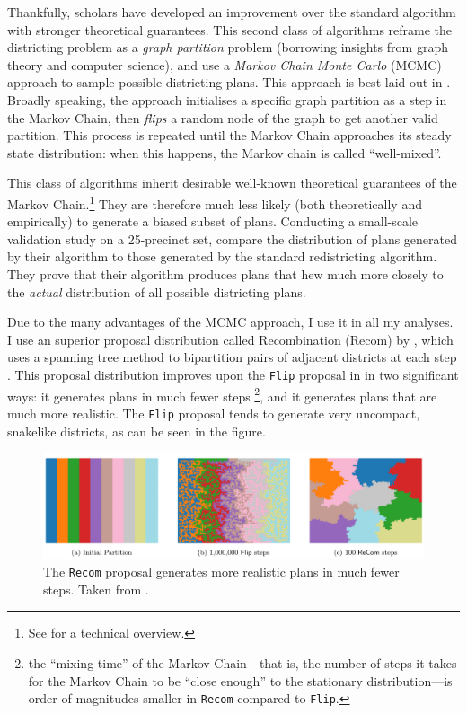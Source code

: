 \documentclass[]{article}
\begin{document}
Thankfully, scholars have developed an improvement over the standard
algorithm with stronger theoretical guarantees. This second class of
algorithms reframe the districting problem as a \emph{graph partition}
problem (borrowing insights from graph theory and computer science), and
use a \emph{Markov Chain Monte Carlo} (MCMC) approach to sample possible
districting plans. This approach is best laid out in \cite{fifieldwp}.
Broadly speaking, the approach initialises a specific graph partition as
a step in the Markov Chain, then \emph{flips} a random node of the graph
to get another valid partition. This process is repeated until the
Markov Chain approaches its steady state distribution: when this
happens, the Markov chain is called ``well-mixed''.

This class of algorithms inherit desirable well-known theoretical
guarantees of the Markov Chain.\footnote{See \cite{ddj2019recom} for a
  technical overview.} They are therefore much less likely (both
theoretically and empirically) to generate a biased subset of plans.
Conducting a small-scale validation study on a 25-precinct set,
\citeauthor{fifieldwp} compare the distribution of plans generated by
their algorithm to those generated by the standard redistricting
algorithm. They prove that their algorithm produces plans that hew much
more closely to the \emph{actual} distribution of all possible
districting plans.

Due to the many advantages of the MCMC approach, I use it in all my
analyses. I use an superior proposal distribution called Recombination
(Recom) by \citeauthor{ddj2019recom}, which uses a spanning tree method
to bipartition pairs of adjacent districts at each step
\citep{ddj2019comp}. This proposal distribution improves upon the
\texttt{Flip} proposal in \citeauthor{fifieldwp} in two significant
ways: it generates plans in much fewer steps \footnote{the ``mixing
  time'' of the Markov Chain---that is, the number of steps it takes for
  the Markov Chain to be ``close enough'' to the stationary
  distribution---is order of magnitudes smaller in \texttt{Recom}
  compared to \texttt{Flip}.}, and it generates plans that are much more
realistic. The \texttt{Flip} proposal tends to generate very uncompact,
snakelike districts, as can be seen in the figure.

\begin{figure}
\centering
\includegraphics{img/recom_vs_flip.png}
\caption{The \texttt{Recom} proposal generates more realistic plans in
much fewer steps. Taken from \cite{ddj2019recom}.}
\end{figure}
\end{document}
